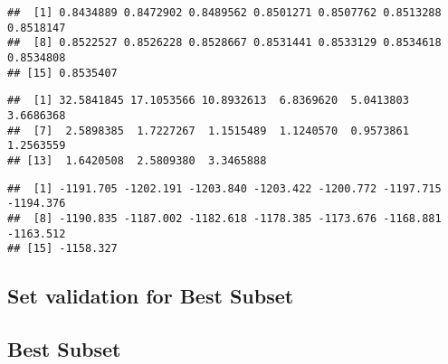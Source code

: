 \documentclass[
]{article}
\newenvironment{Shaded}{\begin{snugshade}}{\end{snugshade}}
\newcommand{\FunctionTok}[1]{\textcolor[rgb]{0.00,0.00,0.00}{#1}}
\newcommand{\NormalTok}[1]{#1}
\newcommand{\SpecialCharTok}[1]{\textcolor[rgb]{0.00,0.00,0.00}{#1}}
\begin{document}
\begin{verbatim}
##  [1] 0.8434889 0.8472902 0.8489562 0.8501271 0.8507762 0.8513288 0.8518147
##  [8] 0.8522527 0.8526228 0.8528667 0.8531441 0.8533129 0.8534618 0.8534808
## [15] 0.8535407
\end{verbatim}

\begin{Shaded}
\end{Shaded}

\begin{verbatim}
##  [1] 32.5841845 17.1053566 10.8932613  6.8369620  5.0413803  3.6686368
##  [7]  2.5898385  1.7227267  1.1515489  1.1240570  0.9573861  1.2563559
## [13]  1.6420508  2.5809380  3.3465888
\end{verbatim}

\begin{Shaded}
\end{Shaded}

\begin{verbatim}
##  [1] -1191.705 -1202.191 -1203.840 -1203.422 -1200.772 -1197.715 -1194.376
##  [8] -1190.835 -1187.002 -1182.618 -1178.385 -1173.676 -1168.881 -1163.512
## [15] -1158.327
\end{verbatim}

\hypertarget{set-validation-for-best-subset}{%
\subsection{Set validation for Best
Subset}\label{set-validation-for-best-subset}}

\hypertarget{best-subset-1}{%
\subsection{Best Subset}\label{best-subset-1}}

\begin{Shaded}
\end{Shaded}
\end{document}
